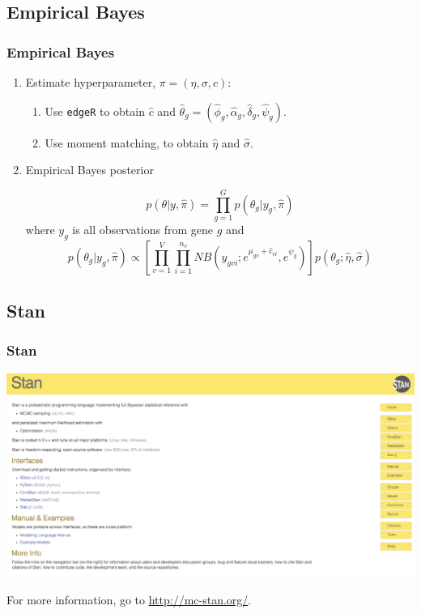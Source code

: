 \documentclass[handout]{beamer}\usepackage[]{graphicx}\usepackage[]{color}
\begin{document}
\subsection{Empirical Bayes}
\begin{frame}
\frametitle{Empirical Bayes}

\begin{enumerate}
\item Estimate hyperparameter, $\pi=(\eta,\sigma,c)$: 

  \begin{enumerate}
  \item Use {\tt edgeR} to obtain $\hat{c}$ and $\hat{\theta}_g = (\hat{\phi}_g,\hat{\alpha}_g,\hat{\delta}_g,\hat{\psi}_g)$. \pause
  \item Use moment matching, to obtain $\hat{\eta}$ and $\hat{\sigma}$.
  \end{enumerate}

\pause
\item Empirical Bayes posterior

\[ p(\theta|y, \hat{\pi}) = \prod_{g=1}^G p(\theta_g|y_g,\hat{\pi}) \]
where $y_g$ is all observations from gene $g$ \pause and 
{\footnotesize
\[ p(\theta_g|y_g,\hat{\pi}) \propto \left[ \prod_{v=1}^V \prod_{i=1}^{n_v} NB\left(y_{gvi};e^{\mu_{gv}+\hat{c}_{vi}}, e^{\psi_g}\right) \right] p\left(\theta_g;\hat{\eta},\hat{\sigma}\right) \]
}
\end{enumerate}
\end{frame}





\subsection{Stan}
\begin{frame}
\frametitle{Stan}

\begin{center}
\includegraphics{stan}
\end{center}

For more information, go to \url{http://mc-stan.org/}.

\end{frame}
\end{document}
